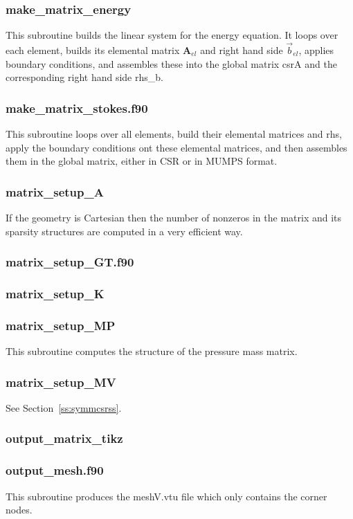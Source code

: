  \subsubsection{make\_matrix\_energy}
 This subroutine builds the linear system for the energy equation. 
 It loops over each element, builds its elemental matrix ${\bm A}_{el}$
 and right hand side $\vec{b}_{el}$, applies boundary conditions, 
 and assembles these into the global matrix csrA and the corresponding 
 right hand side rhs\_b. 
 \subsubsection{make\_matrix\_stokes.f90}
 This subroutine loops over all elements, build their elemental matrices and rhs, 
 apply the boundary conditions ont these elemental matrices, and then 
 assembles them in the global matrix, either in CSR or in MUMPS format.
 \subsubsection{matrix\_setup\_A}
 If the geometry is Cartesian then the number of nonzeros in the matrix and its sparsity 
 structures are computed in a very efficient way. 
 \subsubsection{matrix\_setup\_GT.f90}

 \subsubsection{matrix\_setup\_K}

 \subsubsection{matrix\_setup\_MP}
 This subroutine computes the structure of the pressure mass matrix. 
 \subsubsection{matrix\_setup\_MV}
 See Section~\ref{ss:symmcsrss}. 
 \subsubsection{output\_matrix\_tikz}

 \subsubsection{output\_mesh.f90}
 This subroutine produces the {\filenamefont meshV.vtu} file which only 
 contains the corner nodes.
